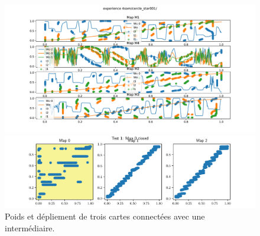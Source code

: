 \begin{figure}[h!]
\begin{minipage}{0.5\textwidth}
\includegraphics[width=\textwidth]{3som_star_w.pdf}
\end{minipage}
\begin{minipage}{0.5\textwidth}
\includegraphics[width=\textwidth]{3som_star_pred.pdf}
\end{minipage}
\caption{Poids et dépliement de trois cartes connectées avec une intermédiaire.}
\label{fig:3som_star}
\end{figure}

